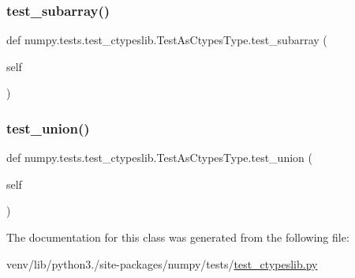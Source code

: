 \subsubsection{\texorpdfstring{test\+\_\+subarray()}{test\_subarray()}}
{\footnotesize\ttfamily def numpy.\+tests.\+test\+\_\+ctypeslib.\+Test\+As\+Ctypes\+Type.\+test\+\_\+subarray (\begin{DoxyParamCaption}\item[{}]{self }\end{DoxyParamCaption})}

\mbox{\label{classnumpy_1_1tests_1_1test__ctypeslib_1_1TestAsCtypesType_ad7ec40c8858ea08efd094b607b26ae56}} 
\subsubsection{\texorpdfstring{test\+\_\+union()}{test\_union()}}
{\footnotesize\ttfamily def numpy.\+tests.\+test\+\_\+ctypeslib.\+Test\+As\+Ctypes\+Type.\+test\+\_\+union (\begin{DoxyParamCaption}\item[{}]{self }\end{DoxyParamCaption})}



The documentation for this class was generated from the following file\+:\begin{DoxyCompactItemize}
\item 
venv/lib/python3./site-\/packages/numpy/tests/\hyperlink{test__ctypeslib_8py}{test\+\_\+ctypeslib.\+py}\end{DoxyCompactItemize}
